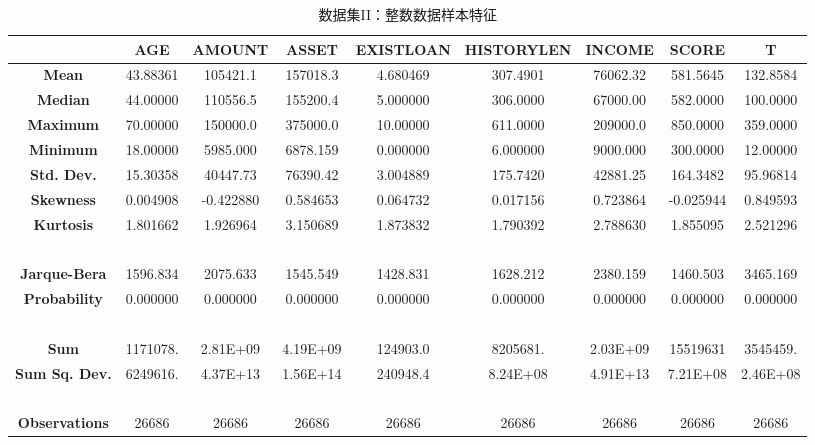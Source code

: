 \documentclass[13.5pt,hyperref,a4paper,UTF8]{ctexart}
\begin{document}
\begin{table}
    \setlength{\belowcaptionskip}{0.2cm}
    \centering
    \caption{数据集II：整数数据样本特征}
    \begin{tabular}{|c|c|c|c|c|c|c|c|c|}
    \hline
        \textbf{} & \textbf{AGE} & \textbf{AMOUNT} & \textbf{ASSET} & \textbf{EXISTLOAN} & \textbf{HISTORYLEN} & \textbf{INCOME} & \textbf{SCORE} & \textbf{T} \\ \hline
        \textbf{Mean} & 43.88361 & 105421.1 & 157018.3 & 4.680469 & 307.4901 & 76062.32 & 581.5645 & 132.8584 \\ \hline
        \textbf{Median} & 44.00000 & 110556.5 & 155200.4 & 5.000000 & 306.0000 & 67000.00 & 582.0000 & 100.0000 \\ \hline
        \textbf{Maximum} & 70.00000 & 150000.0 & 375000.0 & 10.00000 & 611.0000 & 209000.0 & 850.0000 & 359.0000 \\ \hline
        \textbf{Minimum} & 18.00000 & 5985.000 & 6878.159 & 0.000000 & 6.000000 & 9000.000 & 300.0000 & 12.00000 \\ \hline
        \textbf{Std. Dev.} & 15.30358 & 40447.73 & 76390.42 & 3.004889 & 175.7420 & 42881.25 & 164.3482 & 95.96814 \\ \hline
        \textbf{Skewness} & 0.004908 & -0.422880 & 0.584653 & 0.064732 & 0.017156 & 0.723864 & -0.025944 & 0.849593 \\ \hline
        \textbf{Kurtosis} & 1.801662 & 1.926964 & 3.150689 & 1.873832 & 1.790392 & 2.788630 & 1.855095 & 2.521296 \\ \hline
        \textbf{} & ~ & ~ & ~ & ~ & ~ & ~ & ~ & ~ \\ \hline
        \textbf{Jarque-Bera} & 1596.834 & 2075.633 & 1545.549 & 1428.831 & 1628.212 & 2380.159 & 1460.503 & 3465.169 \\ \hline
        \textbf{Probability} & 0.000000 & 0.000000 & 0.000000 & 0.000000 & 0.000000 & 0.000000 & 0.000000 & 0.000000 \\ \hline
        \textbf{} & ~ & ~ & ~ & ~ & ~ & ~ & ~ & ~ \\ \hline
        \textbf{Sum} & 1171078. & 2.81E+09 & 4.19E+09 & 124903.0 & 8205681. & 2.03E+09 & 15519631 & 3545459. \\ \hline
        \textbf{Sum Sq. Dev.} & 6249616. & 4.37E+13 & 1.56E+14 & 240948.4 & 8.24E+08 & 4.91E+13 & 7.21E+08 & 2.46E+08 \\ \hline
        \textbf{} & ~ & ~ & ~ & ~ & ~ & ~ & ~ & ~ \\ \hline
        \textbf{Observations} & 26686 & 26686 & 26686 & 26686 & 26686 & 26686 & 26686 & 26686 \\ \hline
    \end{tabular}
    \label{整数数据样本描述特征模型II}
\end{table}
\end{document}
